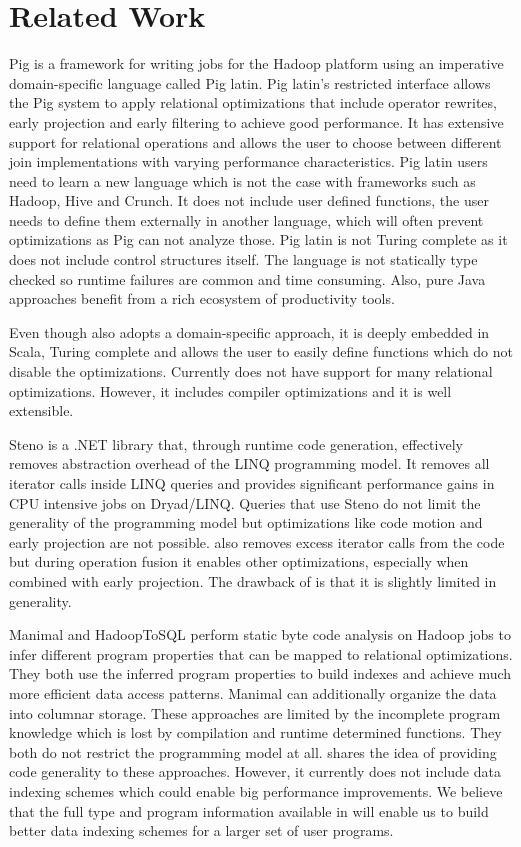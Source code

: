 \section{Related Work}
\label{sec:related-work}

Pig \cite{olston_pig_2008-1} is a framework for writing jobs for the Hadoop
platform using an imperative domain-specific language called Pig latin. Pig
latin's restricted interface allows the Pig system to apply relational optimizations that include operator rewrites, early projection and early filtering to achieve good performance.
It has extensive support for relational operations and allows the user to choose between different join implementations with varying performance characteristics. Pig latin users need to learn a new language which is not the case with frameworks such as Hadoop, Hive and Crunch. It does not include user defined functions, the user needs to define them externally in another language, which will often prevent optimizations as Pig can not analyze those. Pig latin is not Turing complete as it does not include control structures itself.
The language is not statically type checked so runtime failures are common and time consuming. Also, pure Java approaches benefit from a rich ecosystem of productivity tools. 

Even though \tool also adopts a domain-specific approach, it is deeply embedded
in Scala, Turing complete and allows the user to easily define functions which do not disable the optimizations. Currently \tool does not have support for many relational optimizations. However, it includes compiler optimizations and it is well extensible.

Steno \cite{murray_steno:_2011} is a .NET library that, through runtime code generation, effectively removes abstraction overhead of the LINQ programming model. It removes all iterator calls inside LINQ queries and provides significant performance gains in CPU intensive jobs on Dryad/LINQ. Queries that use Steno do not limit the generality of the programming model but optimizations like code motion and early projection are not possible. 
\tool also removes excess iterator calls from the code but during operation fusion it enables other optimizations, especially when combined with early projection. The drawback of \tool is that it is slightly limited in generality.

Manimal \cite{jahani_automatic_2011} and HadoopToSQL \cite{iu_hadooptosql:_2010} perform static byte code analysis on Hadoop jobs to infer different program properties that can be mapped to relational optimizations. They both use the inferred program properties to build indexes and achieve much more efficient data access patterns. Manimal can additionally organize the data into columnar storage. These approaches are limited by the incomplete program knowledge which is lost by compilation and runtime determined functions. They both do not restrict the programming model at all. 
\tool shares the idea of providing code generality to these approaches. However, it currently does not include data indexing schemes which could enable big performance improvements. We believe that the full type and program information available in \tool will enable us to build better data indexing schemes for a larger set of user programs.
